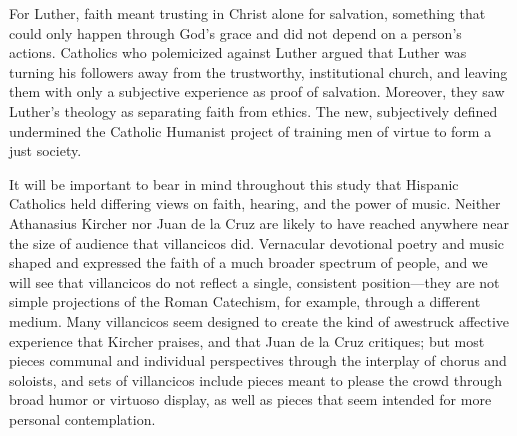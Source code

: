 For Luther, faith meant trusting in Christ alone for salvation, something that could only happen through God's grace and did not depend on a person's actions.
Catholics who polemicized against Luther argued that Luther was turning his followers away from the trustworthy, institutional church, and leaving them with only a subjective experience as proof of salvation.
Moreover, they saw Luther's theology as separating faith from ethics.
The new, subjectively defined  undermined the Catholic Humanist project of training men of virtue to form a just society.


It will be important to bear in mind throughout this study that Hispanic Catholics held differing views on faith, hearing, and the power of music.
Neither Athanasius Kircher nor Juan de la Cruz are likely to have reached anywhere near the size of audience that villancicos did.
Vernacular devotional poetry and music shaped and expressed the faith of a much broader spectrum of people, and we will see that villancicos do not reflect a single, consistent position---they are not simple projections of the Roman Catechism, for example, through a different medium.
Many villancicos seem designed to create the kind of awestruck affective experience that Kircher praises, and that Juan de la Cruz critiques; but most pieces communal and individual perspectives through the interplay of chorus and soloists, and sets of villancicos include pieces meant to please the crowd through broad humor or virtuoso display, as well as pieces that seem intended for more personal contemplation.



